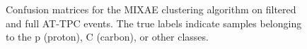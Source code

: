 \begin{figure}[H]
\centering

	\hspace{-1cm}
\caption[MIXAE - confusion matrices]{Confusion matrices for the MIXAE clustering algorithm on filtered and full AT-TPC events. The true labels indicate samples belonging to the p (proton), C (carbon), or other classes. }\label{fig:mixae_confmat}
\end{figure}